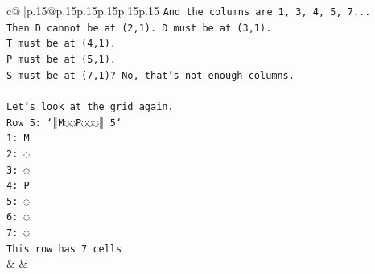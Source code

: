 \documentclass{article}
\begin{document}
{\begin{supertabular}{c@{$\;$}|p{.15\linewidth}@{}p{.15\linewidth}p{.15\linewidth}p{.15\linewidth}p{.15\linewidth}p{.15\linewidth}}
{{{\texttt{And the columns are 1, 3, 4, 5, 7...} \\
\texttt{Then D cannot be at (2,1). D must be at (3,1).} \\
\texttt{T must be at (4,1).} \\
\texttt{P must be at (5,1).} \\
\texttt{S must be at (7,1)? No, that's not enough columns.} \\
\\ 
\texttt{Let's look at the grid again.} \\
\texttt{Row 5: `║M◌◌P◌◌◌║ 5`} \\
\texttt{1: M} \\
\texttt{2: ◌} \\
\texttt{3: ◌} \\
\texttt{4: P} \\
\texttt{5: ◌} \\
\texttt{6: ◌} \\
\texttt{7: ◌} \\
\texttt{This row has 7 cells} \\
            }
        }
    }
    & & \\ \\


\end{supertabular}}
\end{document}

